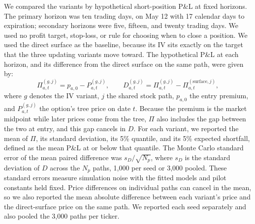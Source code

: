 We compared the variants by hypothetical short-position P\&L at fixed horizons. The primary horizon was ten trading days, on May 12 with 17 calendar days to expiration; secondary horizons were five, fifteen, and twenty trading days. We used no profit target, stop-loss, or rule for choosing when to close a position. We used the direct surface as the baseline, because its IV sits exactly on the target that the three updating variants move toward. The hypothetical P\&L at each horizon, and its difference from the direct surface on the same path, were given by:
\begin{equation}\label{eq:ablation_pnl}
    \Pi_{a,t}^{(g,j)}=p_{a,0}-P_{a,t}^{(g,j)},
    \qquad D_{a,t}^{(g,j)}=\Pi_{a,t}^{(g,j)}-\Pi_{a,t}^{(\mathrm{surface},j)},
\end{equation}
where $g$ denotes the IV variant, $j$ the shared stock path, $p_{a,0}$ the entry premium, and $P_{a,t}^{(g,j)}$ the option's tree price on date $t$. Because the premium is the market midpoint while later prices come from the tree, $\Pi$ also includes the gap between the two at entry, and this gap cancels in $D$. For each variant, we reported the mean of $\Pi$, its standard deviation, its 5\% quantile, and its 5\% expected shortfall, defined as the mean P\&L at or below that quantile. The Monte Carlo standard error of the mean paired difference was $s_D/\sqrt{N_p}$, where $s_D$ is the standard deviation of $D$ across the $N_p$ paths, 1{,}000 per seed or 3{,}000 pooled. These standard errors measure simulation noise with the fitted models and pilot constants held fixed. Price differences on individual paths can cancel in the mean, so we also reported the mean absolute difference between each variant's price and the direct-surface price on the same path. We reported each seed separately and also pooled the 3{,}000 paths per ticker.

